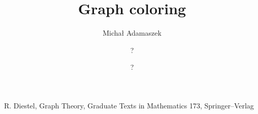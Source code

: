 \documentclass[a4paper,oneside]{report}
\title{\bf Graph coloring}
\author{Micha{\l} Adamaszek \and ? \and ?}
\theoremstyle{plain}
\theoremstyle{myremark}
\begin{document}
\maketitle
\tableofcontents













\begin{thebibliography}{99}
 R. Diestel, Graph Theory, Graduate Texts in Mathematics 173, Springer--Verlag  
\end{thebibliography}
\end{document}
